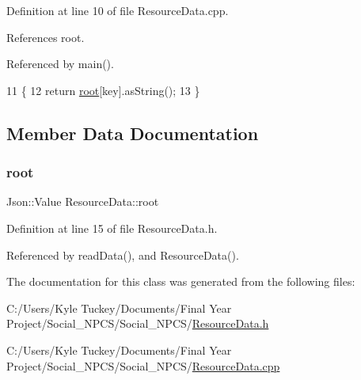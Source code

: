 Definition at line 10 of file Resource\+Data.\+cpp.



References root.



Referenced by main().


\begin{DoxyCode}
11 \{
12     \textcolor{keywordflow}{return} \hyperlink{class_resource_data_a0e9ea464b4a3fae26f68d01e344008fb}{root}[key].asString();
13 \}
\end{DoxyCode}


\subsection{Member Data Documentation}
\mbox{\label{class_resource_data_a0e9ea464b4a3fae26f68d01e344008fb}} 
\subsubsection{\texorpdfstring{root}{root}}
{\footnotesize\ttfamily Json\+::\+Value Resource\+Data\+::root\hspace{0.3cm}{\ttfamily [private]}}



Definition at line 15 of file Resource\+Data.\+h.



Referenced by read\+Data(), and Resource\+Data().



The documentation for this class was generated from the following files\+:\begin{DoxyCompactItemize}
\item 
C\+:/\+Users/\+Kyle Tuckey/\+Documents/\+Final Year Project/\+Social\+\_\+\+N\+P\+C\+S/\+Social\+\_\+\+N\+P\+C\+S/\hyperlink{_resource_data_8h}{Resource\+Data.\+h}\item 
C\+:/\+Users/\+Kyle Tuckey/\+Documents/\+Final Year Project/\+Social\+\_\+\+N\+P\+C\+S/\+Social\+\_\+\+N\+P\+C\+S/\hyperlink{_resource_data_8cpp}{Resource\+Data.\+cpp}\end{DoxyCompactItemize}
